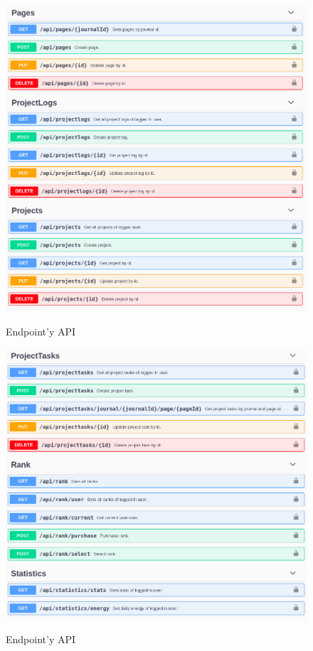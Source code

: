 \documentclass[a4paper,11pt]{report}
\begin{document}
\begin{figure}[H]
	\centering
	\includegraphics[scale=0.5]{implementacja/backend/pages_projectLogs_projects_api}\\
	\caption{Endpoint'y API}
	\label{fig:pages_projectLogs_projects_api}
\end{figure}
\begin{figure}[H]
	\centering
	\includegraphics[scale=0.5]{implementacja/backend/projectTasks_rank_statistics_api}\\
	\caption{Endpoint'y API}
	\label{fig:projectTasks_rank_statistics_api}
\end{figure}
\end{document}
